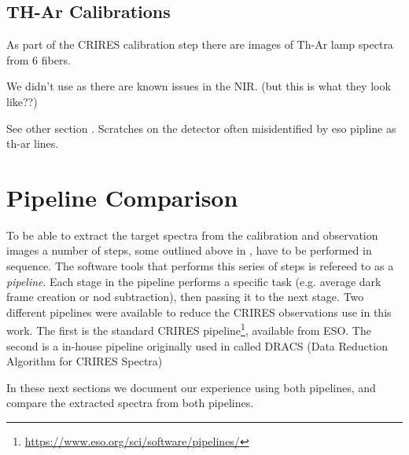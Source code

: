 \subsection{TH-Ar Calibrations}
As part of the CRIRES calibration step there are images of Th-Ar lamp spectra from 6 fibers.

We didn't use as there are known issues in the NIR. (but this is what they look like??)

See other section .
Scratches on the detector often misidentified by eso pipline as th-ar lines.




\section{Pipeline Comparison}
To be able to extract the target spectra from the calibration and observation images a number of steps, some outlined above in , have to be performed in sequence. The software tools that performs this series of steps is refereed to as a \emph{pipeline}. Each stage in the pipeline performs a specific task (e.g. average dark frame creation or nod subtraction), then passing it to the next stage. Two different pipelines were available to reduce the CRIRES observations use in this work. The first is the standard CRIRES pipeline\footnote{\href{https://www.eso.org/sci/software/pipelines/}{https://www.eso.org/sci/software/pipelines/}}, available from ESO.
The second is a in-house pipeline originally  used in \citet{figueira_radial_2010} called DRACS (Data Reduction Algorithm for CRIRES Spectra) 

In these next sections we document our experience using both pipelines, and compare the extracted spectra from both pipelines.


